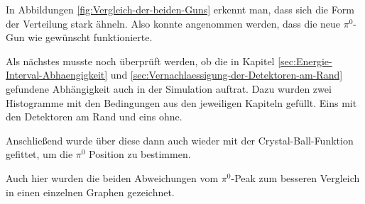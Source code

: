 \documentclass[a4paper,11pt,oneside,final,german,openbib,pdftex]{scrbook}
\begin{document}
{In Abbildungen \ref{fig:Vergleich-der-beiden-Guns} erkennt man, dass sich die Form der Verteilung stark ähneln. Also konnte angenommen werden, dass die neue $\pi^0$-Gun wie gewünscht funktionierte.







Als nächstes musste noch \"uberpr\"uft werden, ob die in Kapitel \ref{sec:Energie-Interval-Abhaengigkeit} und \ref{sec:Vernachlaessigung-der-Detektoren-am-Rand} gefundene Abh\"angigkeit auch in der Simulation auftrat. 
Dazu wurden zwei Histogramme mit den Bedingungen aus den jeweiligen Kapiteln gef\"ullt. Eins mit den Detektoren am Rand und eins ohne.

Anschlie{\ss}end wurde \"uber diese dann auch wieder mit der Crystal-Ball-Funktion gefittet, um die $\pi^0$ Position zu bestimmen.

Auch hier wurden die beiden Abweichungen vom $\pi^0$-Peak zum besseren Vergleich in einen einzelnen Graphen gezeichnet.

}
\end{document}
